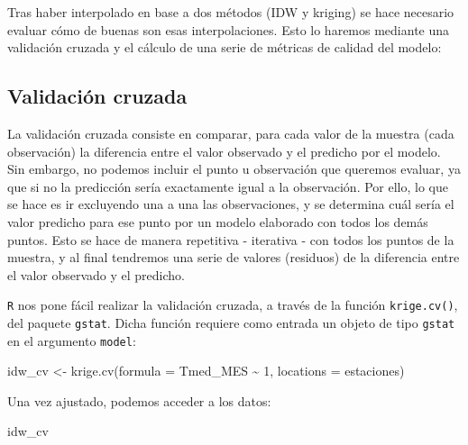 \documentclass[
  letterpaper,
  DIV=11,
  numbers=noendperiod]{scrreprt}
\newenvironment{Shaded}{\begin{snugshade}}{\end{snugshade}}
\newcommand{\AttributeTok}[1]{\textcolor[rgb]{0.40,0.45,0.13}{#1}}
\newcommand{\DecValTok}[1]{\textcolor[rgb]{0.68,0.00,0.00}{#1}}
\newcommand{\FunctionTok}[1]{\textcolor[rgb]{0.28,0.35,0.67}{#1}}
\newcommand{\NormalTok}[1]{\textcolor[rgb]{0.00,0.23,0.31}{#1}}
\newcommand{\OtherTok}[1]{\textcolor[rgb]{0.00,0.23,0.31}{#1}}
\newcommand{\SpecialCharTok}[1]{\textcolor[rgb]{0.37,0.37,0.37}{#1}}
\begin{document}
Tras haber interpolado en base a dos métodos (IDW y kriging) se hace
necesario evaluar cómo de buenas son esas interpolaciones. Esto lo
haremos mediante una validación cruzada y el cálculo de una serie de
métricas de calidad del modelo:

\hypertarget{validaciuxf3n-cruzada}{%
\subsection{Validación cruzada}\label{validaciuxf3n-cruzada}}

La validación cruzada consiste en comparar, para cada valor de la
muestra (cada observación) la diferencia entre el valor observado y el
predicho por el modelo. Sin embargo, no podemos incluir el punto u
observación que queremos evaluar, ya que si no la predicción sería
exactamente igual a la observación. Por ello, lo que se hace es ir
excluyendo una a una las observaciones, y se determina cuál sería el
valor predicho para ese punto por un modelo elaborado con todos los
demás puntos. Esto se hace de manera repetitiva - iterativa - con todos
los puntos de la muestra, y al final tendremos una serie de valores
(residuos) de la diferencia entre el valor observado y el predicho.

\texttt{R} nos pone fácil realizar la validación cruzada, a través de la
función \texttt{krige.cv()}, del paquete \texttt{gstat}. Dicha función
requiere como entrada un objeto de tipo \texttt{gstat} en el argumento
\texttt{model}:

\begin{Shaded}
\begin{Highlighting}[]
\NormalTok{idw\_cv }\OtherTok{\textless{}{-}} \FunctionTok{krige.cv}\NormalTok{(}\AttributeTok{formula =}\NormalTok{ Tmed\_MES }\SpecialCharTok{\textasciitilde{}} \DecValTok{1}\NormalTok{, }\AttributeTok{locations =}\NormalTok{ estaciones) }
\end{Highlighting}
\end{Shaded}

Una vez ajustado, podemos acceder a los datos:

\begin{Shaded}
\begin{Highlighting}[]
\NormalTok{idw\_cv}
\end{Highlighting}
\end{Shaded}
\end{document}
